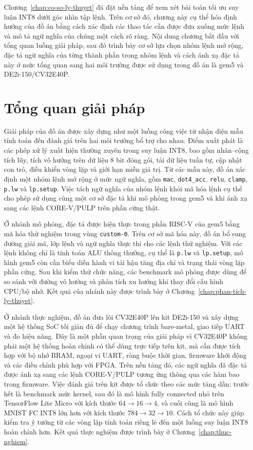 \documentclass[../DoAn.tex]{subfiles}
\begin{document}
Chương~\ref{chap:co-so-ly-thuyet} đã đặt nền tảng để xem xét bài toán tối ưu suy luận INT8 dưới góc nhìn tập lệnh. Trên cơ sở đó, chương này cụ thể hóa định hướng của đồ án bằng cách xác định các thao tác cần được đưa xuống mức lệnh và mô tả ngữ nghĩa của chúng một cách rõ ràng. Nội dung chương bắt đầu với tổng quan luồng giải pháp, sau đó trình bày cơ sở lựa chọn nhóm lệnh mở rộng, đặc tả ngữ nghĩa của từng thành phần trong nhóm lệnh và cách ánh xạ đặc tả này ở mức tổng quan sang hai môi trường được sử dụng trong đồ án là gem5 và DE2i-150/CV32E40P.

\section{Tổng quan giải pháp}
\label{sec:tong-quan-giai-phap}

Giải pháp của đồ án được xây dựng như một luồng công việc từ nhận diện mẫu tính toán đến đánh giá trên hai môi trường bổ trợ cho nhau. Điểm xuất phát là các phép xử lý xuất hiện thường xuyên trong suy luận INT8, bao gồm nhân--cộng tích lũy, tích vô hướng trên dữ liệu 8 bit đóng gói, tải dữ liệu tuần tự, cập nhật con trỏ, điều khiển vòng lặp và giới hạn miền giá trị. Từ các mẫu này, đồ án xác định một nhóm lệnh mở rộng ở mức ngữ nghĩa, gồm \texttt{mac}, \texttt{dot4\_acc}, \texttt{relu}, \texttt{clamp}, \texttt{p.lw} và \texttt{lp.setup}. Việc tách ngữ nghĩa của nhóm lệnh khỏi mã hóa lệnh cụ thể cho phép sử dụng cùng một cơ sở đặc tả khi mô phỏng trong gem5 và khi ánh xạ sang các lệnh CORE-V/PULP trên phần cứng thật.

Ở nhánh mô phỏng, đặc tả được hiện thực trong phần RISC-V của gem5 bằng mã hóa thử nghiệm trong vùng \texttt{custom-0}. Trên cơ sở mã hóa này, đồ án bổ sung đường giải mã, lớp lệnh và ngữ nghĩa thực thi cho các lệnh thử nghiệm. Với các lệnh không chỉ là tính toán ALU thông thường, cụ thể là \texttt{p.lw} và \texttt{lp.setup}, mô hình gem5 còn cần biểu diễn hành vi tải hậu tăng địa chỉ và trạng thái vòng lặp phần cứng. Sau khi kiểm thử chức năng, các benchmark mô phỏng được dùng để so sánh với đường vô hướng và phân tích xu hướng khi thay đổi cấu hình CPU/bộ nhớ. Kết quả của nhánh này được trình bày ở Chương~\ref{chap:phan-tich-ly-thuyet}.

Ở nhánh thực nghiệm, đồ án đưa lõi CV32E40P lên kit DE2i-150 và xây dựng một hệ thống SoC tối giản đủ để chạy chương trình bare-metal, giao tiếp UART và đo hiệu năng. Đây là một phần quan trọng của giải pháp vì CV32E40P không phải một hệ thống hoàn chỉnh có thể dùng trực tiếp trên kit, mà cần được tích hợp với bộ nhớ BRAM, ngoại vi UART, ràng buộc thời gian, firmware khởi động và các điều chỉnh phù hợp với FPGA. Trên nền tảng đó, các ngữ nghĩa đã đặc tả được ánh xạ sang các lệnh CORE-V/PULP tương ứng thông qua các hàm bao trong firmware. Việc đánh giá trên kit được tổ chức theo các mức tăng dần: trước hết là benchmark mức kernel, sau đó là mô hình fully connected nhỏ trên TensorFlow Lite Micro với kích thước \(64 \rightarrow 16 \rightarrow 4\), và cuối cùng là mô hình MNIST FC INT8 lớn hơn với kích thước \(784 \rightarrow 32 \rightarrow 10\). Cách tổ chức này giúp kiểm tra ý tưởng từ các vòng lặp tính toán riêng lẻ đến một luồng suy luận INT8 hoàn chỉnh hơn. Kết quả thực nghiệm được trình bày ở Chương~\ref{chap:thuc-nghiem}.
\end{document}
